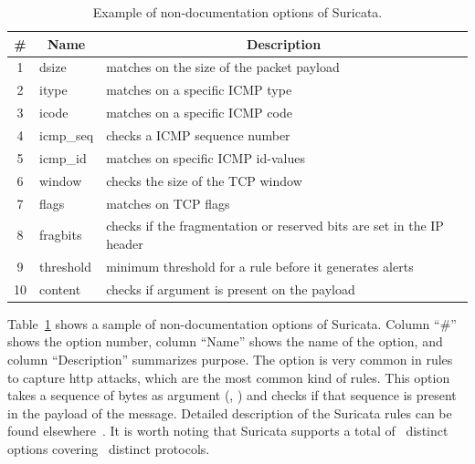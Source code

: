 \documentclass[sigconf,review, anonymous]{acmart}
\begin{document}
\vspace{-1ex}
\begin{table}[h!]
  \footnotesize
  \caption{\label{table:rules}Example of non-documentation options of Suricata.}
  \vspace{-2ex}
  \centering
  \begin{tabular}{clp{5.5cm}}
    \toprule
    \multicolumn{1}{c}{\#} & \multicolumn{1}{c}{Name} &  \multicolumn{1}{c}{Description}\\
    \midrule     
    1 & dsize & matches on the size of the packet payload\\
    2 & itype &  matches on a specific ICMP type\\
    3 & icode & matches on a specific ICMP code\\
    4 & icmp\_seq  & checks a ICMP sequence number\\
    5 & icmp\_id & matches on specific ICMP id-values\\
    6 & window & checks the size of the TCP window\\
    7 & flags & matches on TCP flags\\
    8 & fragbits & checks if the fragmentation or reserved bits are set in the IP header\\
    9 & threshold & minimum threshold for a rule before it generates alerts\\
    10 & content & checks if argument is present on the payload\\
    \bottomrule
  \end{tabular}
\end{table}

Table~\ref{table:rules} shows a sample of non-documentation options of
Suricata. Column ``\#'' shows the option number, column ``Name'' shows
the name of the option, and column ``Description'' summarizes
purpose. The option  is very common in rules to
capture http attacks, which are the most common kind of rules. This
option takes a sequence of bytes as argument (\eg{},
) and checks if that sequence is present
in the payload of the message. Detailed description of the Suricata
rules can be found elsewhere~\cite{suri-rule-format}. It is worth
noting that Suricata supports a total of \totoptions\ distinct options
covering \numproto\ distinct protocols.


\end{document}
